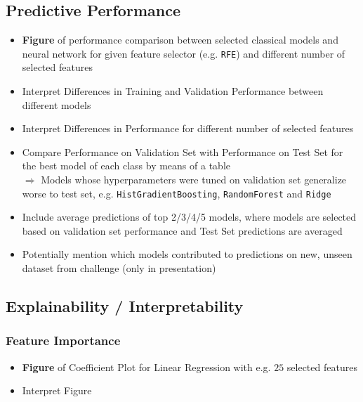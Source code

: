 \documentclass[12pt, letterpaper]{article}
\begin{document}
\subsection{Predictive Performance} %
\begin{itemize}
    \item \textbf{Figure} of performance comparison between selected classical models and neural network for given feature selector (e.g. \texttt{RFE}) and different number of selected features
    \item Interpret Differences in Training and Validation Performance between different models
    \item Interpret Differences in Performance for different number of selected features
    \item Compare Performance on Validation Set with Performance on Test Set for the best model of each class by means of a table \\
          $\Rightarrow$ Models whose hyperparameters were tuned on validation set generalize worse to test set, e.g. \texttt{HistGradientBoosting}, \texttt{RandomForest} and \texttt{Ridge}
    \item Include average predictions of top 2/3/4/5 models, where models are selected based on validation set performance and Test Set predictions are averaged
    \item Potentially mention which models contributed to predictions on new, unseen dataset from challenge (only in presentation)
\end{itemize}


\subsection{Explainability / Interpretability} %

\subsubsection{Feature Importance} %
\begin{itemize}
    \item \textbf{Figure} of Coefficient Plot for Linear Regression with e.g. $25$ selected features
    \item Interpret Figure
\end{itemize}
\end{document}
